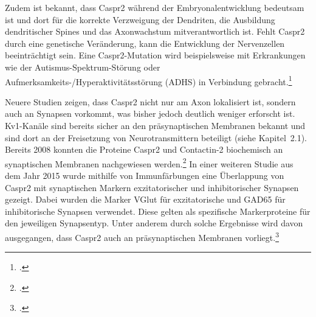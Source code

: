 Zudem ist bekannt, dass Caspr2 während der Embryonalentwicklung
bedeutsam ist und dort für die korrekte Verzweigung der Dendriten, die
Ausbildung dendritischer Spines und das Axonwachstum mitverantwortlich
ist. Fehlt Caspr2 durch eine genetische Veränderung, kann die
Entwicklung der Nervenzellen beeinträchtigt sein. Eine Caspr2-Mutation
wird beispielsweise mit Erkrankungen wie der
Autismus-Spektrum-Störung oder Aufmerksamkeits-/Hyperaktivitätsstörung
(ADHS) in Verbindung
gebracht.\footcite{Canali2018}

Neuere Studien zeigen, dass Caspr2 nicht nur am Axon lokalisiert ist,
sondern auch an Synapsen vorkommt, was bisher jedoch deutlich weniger
erforscht ist. Kv1-Kanäle sind bereits sicher an den präsynaptischen
Membranen bekannt und sind dort an der Freisetzung von
Neurotransmittern beteiligt (siehe Kapitel~2.1). Bereits 2008 konnten die Proteine Caspr2 und Contactin-2 biochemisch an synaptischen Membranen
nachgewiesen werden.\footcite{Bakkaloglu2008}
In einer weiteren Studie aus dem Jahr 2015 wurde mithilfe von
Immunfärbungen eine Überlappung von Caspr2 mit synaptischen Markern
exzitatorischer und inhibitorischer Synapsen gezeigt. Dabei wurden die Marker
VGlut für exzitatorische und GAD65 für inhibitorische Synapsen verwendet. Diese gelten als spezifische Markerproteine für den
jeweiligen Synapsentyp. Unter anderem durch solche Ergebnisse wird davon ausgegangen, dass Caspr2 auch an präsynaptischen Membranen
vorliegt.\footcite{Pinatel2015}

